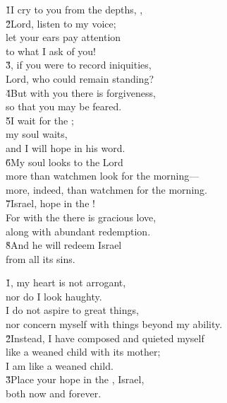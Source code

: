 \begin{poetry}
\poeml \v{1}I cry to you from the depths, , \\
\poeml \v{2}Lord, listen to my voice; \\
\poeml let your ears pay attention \\
\poemll    to what I ask of you! \\
\poeml \v{3}, if you were to record iniquities, \\
\poemll    Lord, who could remain standing? \\
\poeml \v{4}But with you there is forgiveness, \\
\poemll    so that you may be feared. \\
\poeml \v{5}I wait for the ; \\
\poemll    my soul waits, \\
\poemlll       and I will hope in his word. \\
\poeml \v{6}My soul looks to the Lord \\
\poemll    more than watchmen look for the morning--- \\
\poemlll       more, indeed, than watchmen for the morning. \\
\poeml \v{7}Israel, hope in the ! \\
\poemll    For with the  there is gracious love, \\
\poemlll       along with abundant redemption. \\
\poeml \v{8}And he will redeem Israel \\
\poemll    from all its sins.
\end{poetry}

\begin{poetry}
\poeml \v{1}, my heart is not arrogant, \\
\poemll    nor do I look haughty. \\
\poeml I do not aspire to great things, \\
\poemll    nor concern myself with things beyond my ability. \\
\poeml \v{2}Instead, I have composed and quieted myself \\
\poemll    like a weaned child with its mother; \\
\poemlll       I am like a weaned child. \\
\poeml \v{3}Place your hope in the , Israel, \\
\poemll    both now and forever.
\end{poetry}

